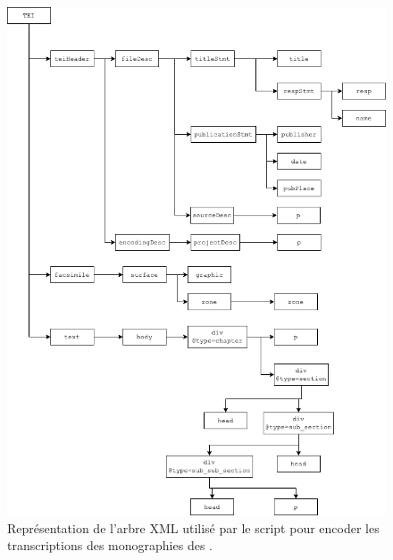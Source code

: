 \begin{figure}
    \centering
    \includegraphics[width=16cm]{img/xml_tree_1.png}
    \caption{Représentation de l'arbre XML utilisé par le script \lse{} pour encoder les transcriptions des monographies des \odm.}
    \label{fig:xmltree1}
\end{figure}

